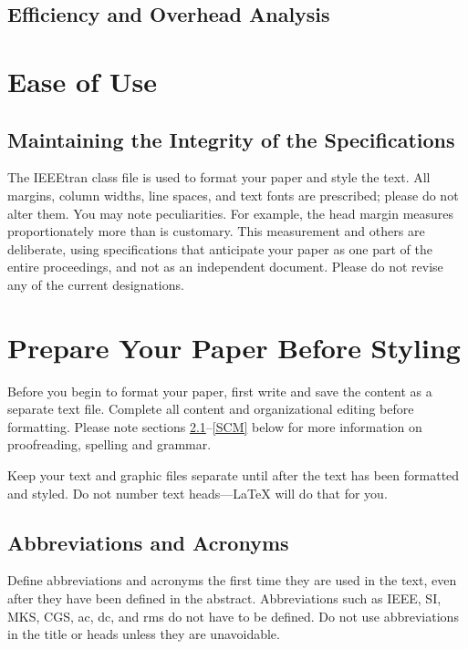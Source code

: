 \documentclass[conference]{IEEEtran}
\begin{document}
\subsection{Efficiency and Overhead Analysis}

\section{Ease of Use}

\subsection{Maintaining the Integrity of the Specifications}

The IEEEtran class file is used to format your paper and style the text. All margins, 
column widths, line spaces, and text fonts are prescribed; please do not 
alter them. You may note peculiarities. For example, the head margin
measures proportionately more than is customary. This measurement 
and others are deliberate, using specifications that anticipate your paper 
as one part of the entire proceedings, and not as an independent document. 
Please do not revise any of the current designations.

\section{Prepare Your Paper Before Styling}
Before you begin to format your paper, first write and save the content as a 
separate text file. Complete all content and organizational editing before 
formatting. Please note sections \ref{AA}--\ref{SCM} below for more information on 
proofreading, spelling and grammar.

Keep your text and graphic files separate until after the text has been 
formatted and styled. Do not number text heads---{\LaTeX} will do that 
for you.

\subsection{Abbreviations and Acronyms}\label{AA}
Define abbreviations and acronyms the first time they are used in the text, 
even after they have been defined in the abstract. Abbreviations such as 
IEEE, SI, MKS, CGS, ac, dc, and rms do not have to be defined. Do not use 
abbreviations in the title or heads unless they are unavoidable.
\end{document}
